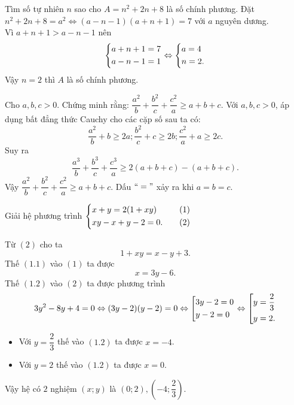 \begin{ex}%
	Tìm số tự nhiên $n$ sao cho $A=n^2+2n+8$ là số chính phương.
	\loigiai
	{
	Đặt $n^2+2n+8=a^2\Leftrightarrow(a-n-1)(a+n+1)=7$ với $a$ nguyên dương.\\
	Vì $a+n+1>a-n-1$ nên $$\left\{\begin{aligned}&a+n+1=7\\&a-n-1=1\end{aligned}\right.\Leftrightarrow\left\{\begin{aligned}&a=4\\&n=2.\end{aligned}\right.$$
	Vậy $n=2$ thì $A$ là số chính phương.
	}
\end{ex}

\begin{ex}%
	Cho $a,b,c>0$. Chứng minh rằng:  $\dfrac{a^2}{b}+\dfrac{b^2}{c}+\dfrac{c^2}{a}\geq a+b+c.$
	\loigiai
	{
	Với $a,b,c>0$, áp dụng bất đẳng thức Cauchy cho các cặp số sau ta có:
	$$\dfrac{a^2}{b}+b\ge 2a;\dfrac{b^2}{c}+c\ge 2b;\dfrac{c^2}{a}+a\ge 2c.$$
	Suy ra $$\dfrac{a^3}{b}+\dfrac{b^3}{c}+\dfrac{c^3}{a}\ge 2(a+b+c)-(a+b+c).$$
	Vậy $\dfrac{a^2}{b}+\dfrac{b^2}{c}+\dfrac{c^2}{a} \ge a+b+c$. Dấu $``="$ xảy ra khi $a=b=c$.	
	}
\end{ex}

\begin{ex}%
	Giải hệ phương trình $\left\{\begin{aligned}&x+y=2(1+xy)&\quad(1)\\&xy-x+y-2=0.&\quad(2)\end{aligned}\right.$
	\loigiai
	{
	Từ $(2)$ cho ta \begin{equation}
		1+xy=x-y+3.
	\end{equation}
	Thế $(1.1)$ vào $(1)$ ta được 
	\begin{equation}
		x=3y-6.
	\end{equation}
	Thế $(1.2)$ vào $(2)$ ta được phương trình $$3y^2-8y+4=0\Leftrightarrow(3y-2)(y-2)=0\Leftrightarrow\left[\begin{aligned}&3y-2=0\\&y-2=0\end{aligned}\right.\Leftrightarrow\left[\begin{aligned}&y=\dfrac{2}{3}\\&y=2.\end{aligned}\right.$$
	\begin{itemize}
		\item Với $y=\dfrac{2}{3}$ thế vào $(1.2)$ ta được $x=-4$.
		\item Với $y=2$ thế vào $(1.2)$ ta được $x=0$.
	\end{itemize}
	Vậy hệ có $2$ nghiệm $(x;y)$ là $(0;2),\left(-4;\dfrac{2}{3}\right)$.
	}
\end{ex}

